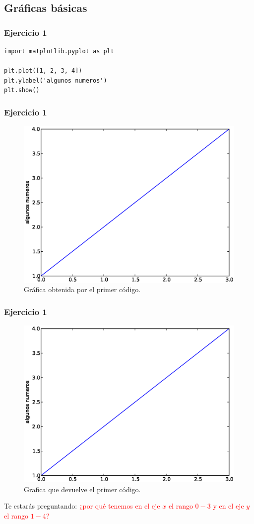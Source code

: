 \subsection{Gráficas básicas}
\begin{frame}[fragile]
\frametitle{Ejercicio 1}
\begin{lstlisting}[caption=Gráfica básica, basicstyle=\linespread{1.2}\ttfamily\small, columns=fullflexible]
import matplotlib.pyplot as plt

plt.plot([1, 2, 3, 4])
plt.ylabel('algunos numeros')
plt.show()
\end{lstlisting}
\end{frame}
\begin{frame}[fragile]
\frametitle{Ejercicio 1}
\begin{figure}
	\centering
	\includegraphics[scale=0.35]{Imagenes/plotEjercicio1.eps}
	\caption{Gráfica obtenida por el primer código.}
\end{figure}
\end{frame}
\begin{frame}[fragile]
\frametitle{Ejercicio 1}
\begin{figure}
	\centering
	\includegraphics[scale=0.25]{Imagenes/plotEjercicio1.eps}
	\caption{Grafica que devuelve el primer código.}
\end{figure}
Te estarás preguntando: \textcolor{red}{ ¿por qué tenemos en el eje $x$ el rango $0-3$ y en el eje $y$ el rango  $1-4$?}
\end{frame}

